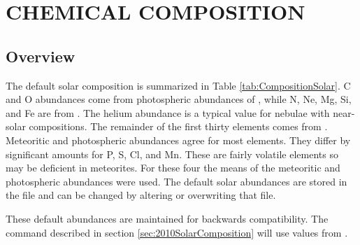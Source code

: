 \chapter{CHEMICAL COMPOSITION}

\section{Overview}

The default solar composition is summarized in Table
\ref{tab:CompositionSolar}.  C and O abundances come from photospheric
abundances of \citet{Allende2002,Allende2001}, while N, Ne, Mg, Si,
and Fe are from \citet{Holweger2001}.  The helium abundance is a
typical value for nebulae with near-solar compositions.  The remainder
of the first thirty elements comes from \citet{Grevesse1998}.
Meteoritic and photospheric abundances agree for most elements.  They
differ by significant amounts for P, S, Cl, and Mn.  These are fairly
volatile elements so may be deficient in meteorites.  For these four
the means of the meteoritic and photospheric abundances were used.
The default solar abundances are stored in the file
 and can be changed
by altering or overwriting that file.

These default abundances are maintained for backwards compatibility.
The  command described 
in section \ref{sec:2010SolarComposition} will use values from 
\citet{Grevesse2010}.

